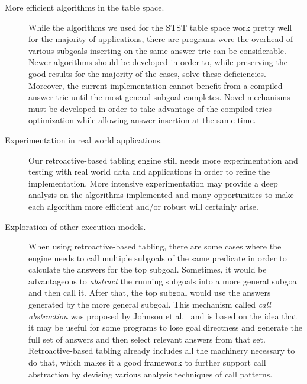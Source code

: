 \begin{description}
   
   \item[More efficient algorithms in the table space.] While the algorithms we used for the STST table space
   work pretty well for the majority of applications, there are programs were the overhead of various
   subgoals inserting on the same answer trie can be considerable. Newer algorithms should be developed in order to,
   while preserving the good results for the majority of the cases, solve these deficiencies. Moreover,
   the current implementation cannot benefit from a compiled answer trie until the most general subgoal completes.
   Novel mechanisms must be developed in order to take advantage of the compiled tries optimization while
   allowing answer insertion at the same time.
   
   \item[Experimentation in real world applications.] Our retroactive-based tabling engine still needs more
   experimentation and testing with real world data and applications in order to refine the implementation.
   More intensive experimentation may provide a deep analysis on the algorithms implemented and many opportunities
   to make each algorithm more efficient and/or robust will certainly arise.
   
   \item[Exploration of other execution models.] When using retroactive-based tabling, there are some cases where the
   engine needs to call multiple subgoals of the same predicate in order to calculate the answers for the top subgoal.
   Sometimes, it would be advantageous to \emph{abstract} the running subgoals into a more general subgoal and then
   call it. After that, the top subgoal would use the answers generated by the more general subgoal. This mechanism
   called \emph{call abstraction} was proposed by Johnson et al.~\cite{Johnson-99} and is based on the idea that it
   may be useful for some programs to lose goal directness and generate the full set of answers and then select relevant
   answers from that set. Retroactive-based tabling already includes all the machinery necessary to do that, which makes
   it a good framework to further support call abstraction by devising various analysis techniques of call patterns.
   
\end{description}

